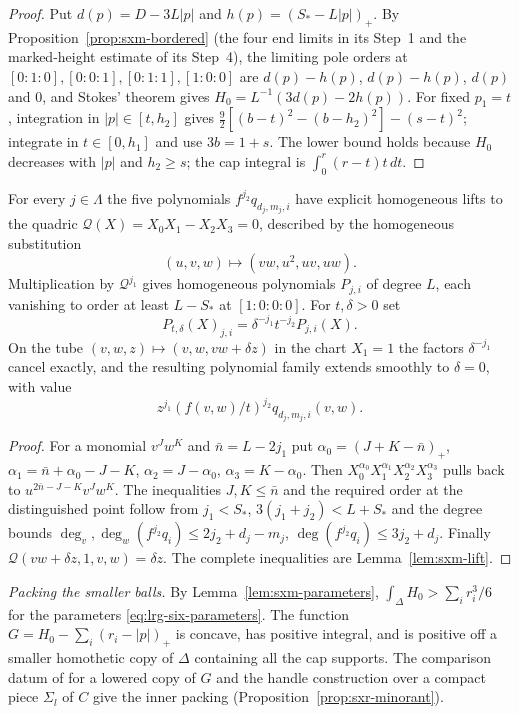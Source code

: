 \begin{proof}
Put $d(p)=D-3L|p|$ and $h(p)=(S_*-L|p|)_+$. By Proposition~\ref{prop:sxm-bordered} (the four end limits in its
Step~1 and the marked-height estimate of its Step~4), the limiting pole orders at $[0:1:0],[0:0:1],[0:1:1],[1:0:0]$ are
$d(p)-h(p)$, $d(p)-h(p)$, $d(p)$ and $0$, and Stokes' theorem gives $H_0=L^{-1}(3d(p)-2h(p))$. For fixed $p_1=t$,
integration in $|p|\in[t,h_2]$ gives $\frac92[(b-t)^2-(b-h_2)^2]-(s-t)^2$; integrate in $t\in[0,h_1]$ and use
$3b=1+s$. The lower bound holds because $H_0$ decreases with $|p|$ and $h_2\ge s$; the cap integral is
$\int_0^r(r-t)t\,dt$.
\end{proof}

\begin{proposition}\label{prop:lrg-six-polynomials}
For every $j\in\Lambda$ the five polynomials $f^{j_2}q_{d_j,m_j,i}$ have explicit homogeneous lifts to the quadric
$\mathcal Q(X)=X_0X_1-X_2X_3=0$, described by the homogeneous substitution
\[
 (u,v,w)\longmapsto(vw,u^2,uv,uw).
\]
Multiplication by $\mathcal Q^{j_1}$ gives homogeneous polynomials $P_{j,i}$ of degree $L$,
each vanishing to order at least $L-S_*$ at $[1:0:0:0]$.
For $t,\delta>0$ set
\[
 P_{t,\delta}(X)_{j,i}=\delta^{-j_1}t^{-j_2}P_{j,i}(X).
\]
On the tube $(v,w,z)\mapsto(v,w,vw+\delta z)$ in the chart $X_1=1$ the factors $\delta^{-j_1}$ cancel exactly, and
the resulting polynomial family extends smoothly to $\delta=0$, with value
\[
 z^{j_1}(f(v,w)/t)^{j_2}q_{d_j,m_j,i}(v,w).
\]
\end{proposition}

\begin{proof}
For a monomial $v^Jw^K$ and $\bar n=L-2j_1$ put $\alpha_0=(J+K-\bar n)_+$, $\alpha_1=\bar n+\alpha_0-J-K$,
$\alpha_2=J-\alpha_0$, $\alpha_3=K-\alpha_0$. Then $X_0^{\alpha_0}X_1^{\alpha_1}X_2^{\alpha_2}X_3^{\alpha_3}$ pulls back to
$u^{2\bar n-J-K}v^Jw^K$. The inequalities $J,K\le\bar n$ and the required order at the distinguished point follow
from $j_1<S_*$, $3(j_1+j_2)<L+S_*$ and the degree bounds $\deg_v,\deg_w(f^{j_2}q_i)\le2j_2+d_j-m_j$,
$\deg(f^{j_2}q_i)\le3j_2+d_j$. Finally $\mathcal Q(vw+\delta z,1,v,w)=\delta z$. The complete inequalities are
Lemma~\ref{lem:sxm-lift}.
\end{proof}

\emph{Packing the smaller balls.} By Lemma~\ref{lem:sxm-parameters}, $\int_\Delta H_0>\sum_i r_i^3/6$ for the parameters
\eqref{eq:lrg-six-parameters}. The function $G=H_0-\sum_i(r_i-|p|)_+$ is concave, has positive integral, and is
positive off a smaller homothetic copy of $\Delta$ containing all the cap supports. The comparison datum of
 for a lowered copy of $G$ and the handle construction over a compact piece $\Sigma_l$ of $C$
give the inner packing (Proposition~\ref{prop:sxr-minorant}).

